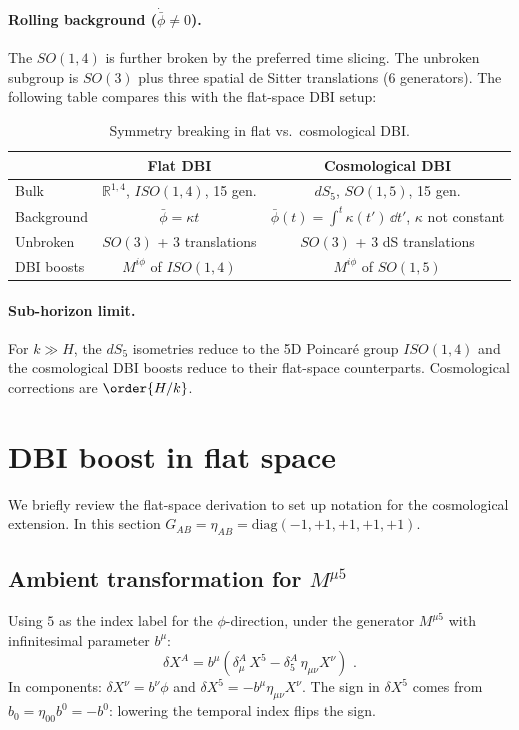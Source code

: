 \documentclass[11pt]{article}
\begin{document}
\paragraph{Rolling background ($\dot{\bar\phi} \neq 0$).}
The $SO(1,4)$ is further broken by the preferred time slicing.  The unbroken subgroup is $SO(3)$ plus
three spatial de Sitter translations (6 generators).  The following table compares this with the
flat-space DBI setup:
\begin{table}[h]
\centering
\begin{tabular}{lcc}
\toprule
 & Flat DBI & Cosmological DBI \\
\midrule
Bulk & $\mathbb{R}^{1,4}$, $ISO(1,4)$, 15 gen. & $dS_5$, $SO(1,5)$, 15 gen. \\
Background & $\bar\phi = \kappa t$ & $\bar\phi(t) = \int^t\kappa(t')\,\dd t'$, $\kappa$ not constant \\
Unbroken & $SO(3)$ + 3 translations & $SO(3)$ + 3 dS translations \\
DBI boosts & $M^{i\phi}$ of $ISO(1,4)$ & $M^{i\phi}$ of $SO(1,5)$ \\
\bottomrule
\end{tabular}
\caption{Symmetry breaking in flat vs.\ cosmological DBI.}
\label{tab:sym-breaking}
\end{table}

\paragraph{Sub-horizon limit.}
For $k \gg H$, the $dS_5$ isometries reduce to the 5D Poincar\'e group $ISO(1,4)$ and the cosmological
DBI boosts reduce to their flat-space counterparts.  Cosmological corrections are $\order{H/k}$.

\section{DBI boost in flat space}
\label{sec:flat-dbi-boost}

We briefly review the flat-space derivation to set up notation for the cosmological extension.
In this section $G_{AB} = \eta_{AB} = \mathrm{diag}(-1,+1,+1,+1,+1)$.

\subsection{\texorpdfstring{Ambient transformation for $M^{\mu 5}$}{Ambient transformation for M\^{}mu5}}

Using $5$ as the index label for the $\phi$-direction, under the generator $M^{\mu 5}$ with
infinitesimal parameter $b^\mu$:
\begin{equation}
\label{eq:ambient-transform}
\delta X^A = b^\mu\!\left(\delta^A_\mu\, X^5 - \delta^A_5\,\eta_{\mu\nu} X^\nu\right) \,\,.
\end{equation}
In components: $\delta X^\nu = b^\nu\phi$ and $\delta X^5 = -b^\mu\eta_{\mu\nu}X^\nu$.
The sign in $\delta X^5$ comes from $b_0 = \eta_{00}b^0 = -b^0$: lowering the temporal index flips
the sign.
\end{document}
